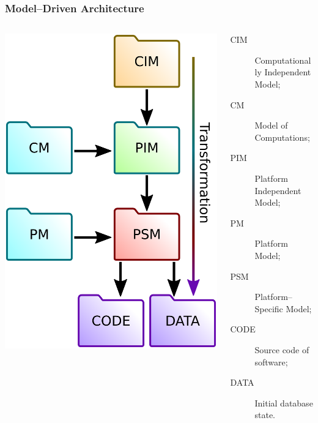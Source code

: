\documentclass[10pt]{beamer}
\begin{document}
\begin{frame}[fragile]
  \frametitle{Model--Driven Architecture}

  \begin{columns}
    \begin{column}{0.4\textwidth}
      \includegraphics[width=1\linewidth]{mda-most-general.pdf}
    \end{column}
    \begin{column}{0.7\linewidth}
      \begin{description}
      \item[CIM] Computationally Independent Model;
      \item[CM] Model of Computations;
      \item[PIM] Platform Independent Model;
      \item[PM] Platform Model;
      \item[PSM] Platform--Specific Model;
      \item[CODE] Source code of software;
      \item[DATA] Initial database state.
      \end{description}
    \end{column}
  \end{columns}
\end{frame}
\end{document}
